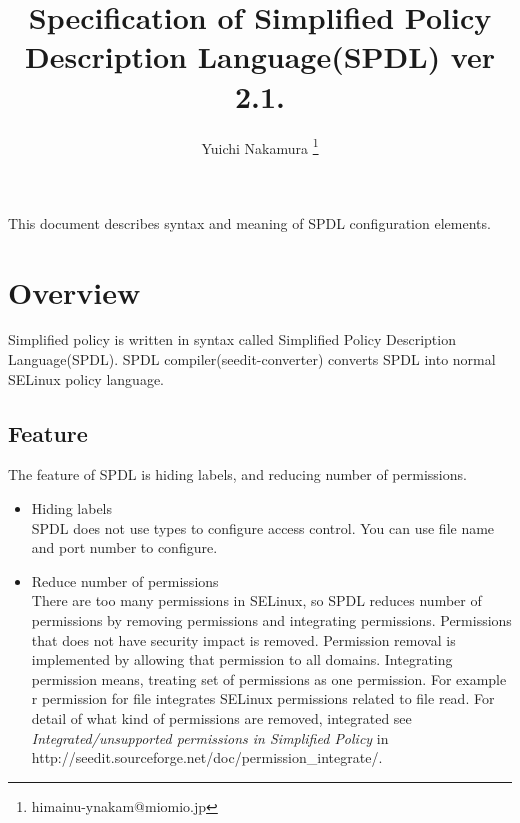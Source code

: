 \documentclass{article}
\title{Specification of Simplified Policy Description Language(SPDL) ver 2.1.}
\author{Yuichi Nakamura \thanks{himainu-ynakam@miomio.jp}}
\begin{document}
\maketitle
\tableofcontents
\newpage
This document describes syntax and meaning of SPDL configuration elements.



\section{Overview}
Simplified policy is written in  syntax  called Simplified Policy
Description Language(SPDL). SPDL compiler(seedit-converter) converts
SPDL into normal SELinux policy language.

\subsection{Feature}
The feature of SPDL is hiding labels, and reducing number of
permissions.
\begin{itemize}
 \item Hiding labels\\
       SPDL does not use types to configure access control. You can use
       file name and port number to configure.
 \item Reduce number of permissions\\
       There are too many permissions in SELinux, so SPDL reduces number
       of permissions by removing permissions and integrating
       permissions.
       Permissions that does not have security impact is
       removed. Permission removal is implemented by allowing that
       permission to all domains. Integrating permission means, treating
       set of permissions as one permission. For example r permission
       for file integrates SELinux permissions related to file read.
       For detail of what kind of permissions are removed, integrated  see {\it
       Integrated/unsupported permissions in Simplified Policy } in
       http://seedit.sourceforge.net/doc/permission\_integrate/.
\end{itemize}
\end{document}

